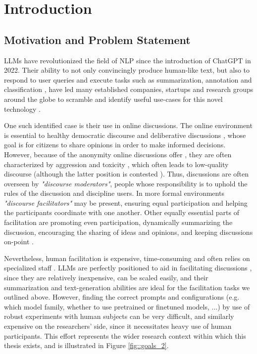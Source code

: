 %
\chapter{Introduction}
\label{sec:intro}

\section{Motivation and Problem Statement}
\label{sec:intro:motivation}

\acp{LLM} have revolutionized the field of \ac{NLP} since the introduction of ChatGPT in 2022. Their ability to not only convincingly produce human-like text, but also to respond to user queries and execute tasks such as summarization, annotation and classification \cite{ts2024, tan2024largelanguagemodelsdata}, have led many established companies, startups and research groups around the globe to scramble and identify useful use-cases for this novel technology \cite{HadiASO, Zhou2024LargeLM, Hutchinson2024LLMAssistedVA}.

One such identified case is their use in online discussions. The online environment is essential to  healthy democratic discourse \cite{WrightDemocracy, Janssen2005, Papacharissi2004DemocracyOC} and deliberative discussions \cite{small2021polis}, whose goal is for citizens to share opinions in order to make informed decisions. However, because of the anonymity online discussions offer \cite{Avalle2024PersistentIP}, they are often characterized by aggression and toxicity \cite{XiaToxicity}, which often leads to low-quality discourse \cite{WrightDemocracy} (although the latter position is contested \cite{Papacharissi2004DemocracyOC}). Thus, discussions are often overseen by \textit{"discourse moderators"}, people whose responsibility is to uphold the rules of the discussion and discipline users. In more formal environments \textit{"discourse facilitators"} may be present, ensuring equal participation and helping the participants coordinate with one another. Other equally essential parts of facilitation are promoting even participation, dynamically summarizing the discussion, encouraging the sharing of ideas and opinions, and keeping discussions on-point \cite{Harvard2024, Wang2008StudentfacilitatorsRI}.

Nevertheless, human facilitation is expensive, time-consuming and often relies on specialized staff \cite{small-polis-llm}. LLMs are perfectly positioned to aid in facilitating discussions \cite{small-polis-llm}, since they are relatively inexpensive, can be scaled easily, and their summarization and text-generation abilities are ideal for the facilitation tasks we outlined above. However, finding the correct prompts and configurations (e.g. which model family, whether to use pretrained or finetuned models, ...) by use of robust experiments with human subjects can be very difficult, and similarly expensive on the researchers' side, since it necessitates heavy use of human participants. This effort represents the wider research context within which this thesis exists, and is illustrated in Figure \ref{fig::goals_2}.

